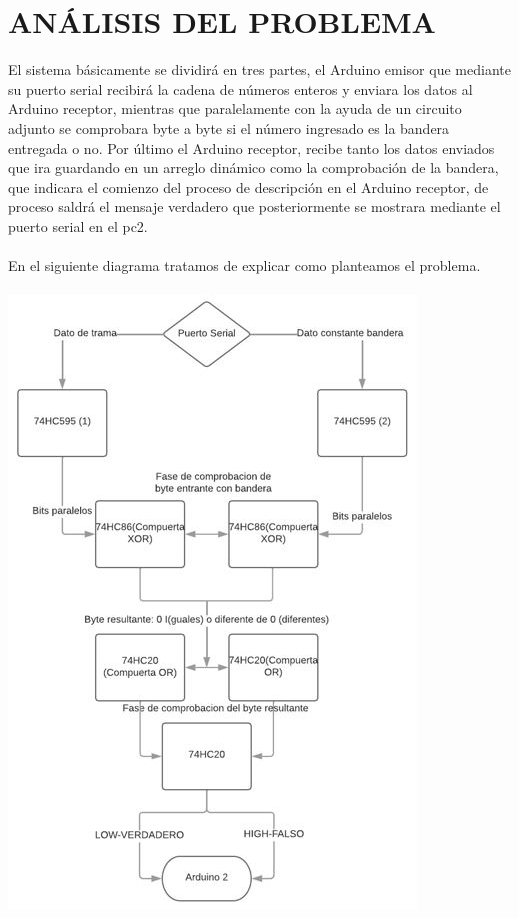 \documentclass{article}
\begin{document}
\newpage
\section{ANÁLISIS DEL PROBLEMA}
\label{Análisis}

El sistema básicamente se dividirá en tres partes, el Arduino emisor que mediante su puerto serial recibirá la cadena de números enteros y enviara los datos al Arduino receptor, mientras que paralelamente con la ayuda de un circuito adjunto se comprobara byte a byte si el número ingresado es la bandera entregada o no. Por último el Arduino receptor, recibe tanto los datos enviados que ira guardando en un arreglo dinámico como la comprobación de la bandera, que indicara el comienzo del proceso de descripción en el Arduino receptor, de proceso saldrá el mensaje verdadero que posteriormente se mostrara mediante el puerto serial en el pc2.\\
\\
En el siguiente diagrama tratamos de explicar como planteamos el problema.\\
\\
\includegraphics[scale=0.7]{Captura6.JPG}\\
\end{document}
